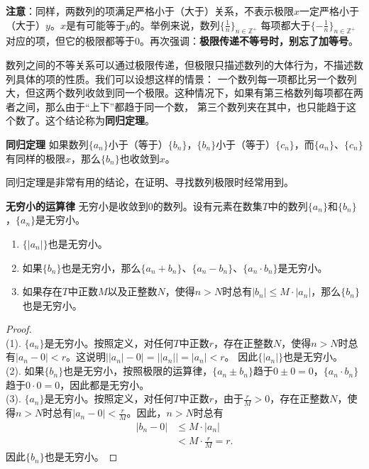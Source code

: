 \documentclass[12pt,UTF8]{ctexbook}
\begin{document}
\begin{appendix}
\textbf{注意}：同样，两数列的项满足严格小于（大于）关系，不表示极限$x$一定严格小于（大于）$y$。$x$是有可能等于$y$的。举例来说，数列$\{\frac{1}{n}\}_{n\in\mathbb{Z}^+}$
每项都大于$\{-\frac{1}{n}\}_{n\in\mathbb{Z}^+}$对应的项，但它的极限都等于$0$。再次强调：\textbf{极限传递不等号时，别忘了加等号}。

数列之间的不等关系可以通过极限传递，但极限只描述数列的大体行为，不描述数列具体的项的性质。我们可以设想这样的情景：
一个数列每一项都比另一个数列大，但这两个数列收敛到同一个极限。这种情况下，如果有第三格数列每项都在两者之间，那么由于“上下”都趋于同一个数，
第三个数列夹在其中，也只能趋于这个数了。这个结论称为\textbf{同归定理}。
\begin{tm}{\textbf{同归定理}}\label{tm:a-0-48}
    如果数列$\{a_n\}$小于（等于）$\{b_n\}$，$\{b_n\}$小于（等于）$\{c_n\}$，而$\{a_n\}$、$\{c_n\}$有同样的极限$x$，那么$\{b_n\}$也收敛到$x$。
\end{tm}

同归定理是非常有用的结论，在证明、寻找数列极限时经常用到。

\begin{tm}{\textbf{无穷小的运算律}}\label{tm:a-0-50}
    无穷小是收敛到$0$的数列。设有元素在数集$T$中的数列$\{a_n\}$和$\{b_n\}$，$\{a_n\}$是无穷小。
    \begin{enumerate}
        \item $\{|a_n|\}$也是无穷小。
        \item 如果$\{b_n\}$也是无穷小，那么$\{a_n + b_n\}$、$\{a_n - b_n\}$、$\{a_n\cdot b_n\}$是无穷小。
        \item 如果存在$T$中正数$M$以及正整数$N$，使得$n>N$时总有$|b_n| \leqslant M\cdot |a_n|$，那么$\{b_n\}$也是无穷小。
    \end{enumerate}
\end{tm}
\begin{proof}
    \mbox{} \\
    (1). $\{a_n\}$是无穷小。按照定义，对任何$T$中正数$r$，存在正整数$N$，使得$n>N$时总有$|a_n - 0| < r$。这说明$\big||a_n| - 0\big| = \big||a_n|\big| = |a_n| < r$。
    因此$\{|a_n|\}$也是无穷小。\\
    (2). 如果$\{b_n\}$也是无穷小，按照极限的运算律，$\{a_n \pm b_n\}$趋于$0 \pm 0 = 0$，$\{a_n \cdot b_n\}$趋于$0 \cdot 0 = 0$，因此都是无穷小。\\
    (3). $\{a_n\}$是无穷小。按照定义，对任何$T$中正数$r$，由于$\frac{r}{M} > 0$，存在正整数$N$，使得$n>N$时总有$|a_n - 0| < \frac{r}{M}$。因此，$n>N$时总有
    \begin{align*}
        |b_n - 0| &\leqslant M\cdot |a_n|  \\ 
        &< M\cdot \frac{r}{M} = r.  
    \end{align*}
    因此$\{b_n\}$也是无穷小。
\end{proof}


\end{appendix}
\end{document}
